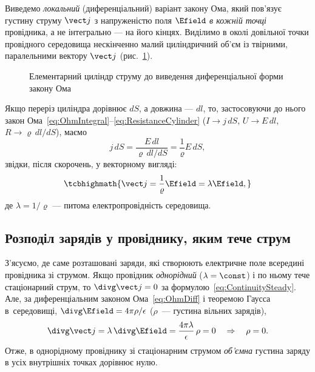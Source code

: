 Виведемо \emph{локальний} (диференціальний) варіант закону Ома, який пов'язує густину струму $\vect j$ з напруженістю поля $\Efield$ \emph{в
	кожній точці} провідника, а не інтегрально --- на його кінцях. Виділимо в околі довільної точки провідного середовища нескінченно малий
циліндричний об'єм із твірними, паралельними вектору $\vect j$ (рис.~\ref{pic:DiffOhmLaw}).

\begin{figure}\centering
	\caption{Елементарний циліндр струму до виведення диференціальної форми закону Ома\label{pic:DiffOhmLaw}}
\end{figure}

Якщо переріз циліндра дорівнює $dS$, а довжина --- $dl$, то, застосовуючи до нього закон
Ома~\eqref{eq:OhmIntegral}--\eqref{eq:ResistanceCylinder} ($I \to j\, dS$, $U \to E\, dl$, $R \to \varrho\, dl/dS$), маємо
\begin{equation*}
	j\, dS = \frac{E\, dl}{\varrho\, dl/dS} = \frac1\varrho E\, dS,
\end{equation*}
звідки, після скорочень, у векторному вигляді:
\begin{equation}\label{eq:OhmDiff}
	\tcbhighmath{
		\vect j = \frac1\varrho \Efield = \lambda\Efield,
	}
\end{equation}
де $\lambda = 1/\varrho$ --- питома електропровідність середовища.


\subsection*{Розподіл зарядів у провіднику, яким тече струм}

З'ясуємо, де саме розташовані заряди, які створюють електричне поле всередині провідника зі струмом. Якщо провідник \emph{однорідний}
($\lambda = \const$) і по ньому тече стаціонарний струм, то $\divg\vect j = 0$ за формулою~\eqref{eq:ContinuitySteady}. Але, за диференціальним
законом Ома~\eqref{eq:OhmDiff} і теоремою Гаусса в~середовищі, $\divg\Efield = 4\pi\rho/\epsilon$ ($\rho$~--- густина вільних
зарядів),
\begin{equation}\label{eq:VolumeChargeZero}
	\divg\vect j = \lambda\,\divg\Efield = \frac{4\pi\lambda}{\epsilon}\,\rho = 0 \quad\Rightarrow\quad \rho = 0.
\end{equation}
Отже, в однорідному провіднику зі стаціонарним струмом \emph{об'ємна} густина заряду в усіх внутрішніх точках дорівнює нулю.

